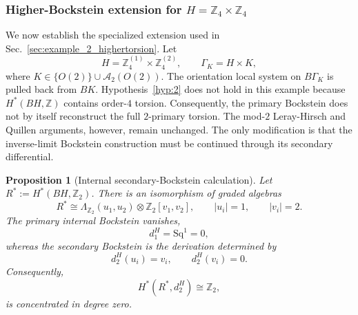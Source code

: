 \documentclass[aps,prx,reprint,superscriptaddress,twocolumn,amsmath,amssymb,amsfonts, nofootinbib]{revtex4-2}
\theoremstyle{apsstyle}
\newtheorem{proposition}[theorem]{Proposition}
\begin{document}
\subsubsection{Higher-Bockstein extension for $H=\mathbb Z_4\times\mathbb Z_4$}
\label{app:higher_order_example}

We now establish the specialized extension used in
Sec.~\ref{sec:example_2_highertorsion}. Let
\begin{equation*}
H=\mathbb Z_4^{(1)}\times\mathbb Z_4^{(2)},
\qquad
\Gamma_K=H\times K,
\end{equation*}
where $K\in\{O(2)\}\cup\mathcal A_2(O(2))$. The orientation local system on $B\Gamma_K$ is pulled back from $BK$. Hypothesis~\ref{hyp:2} does not hold in this example because
$H^{*}(BH,\mathbb Z)$ contains order-$4$ torsion. Consequently, the primary Bockstein does not by itself reconstruct the full
$2$-primary torsion. The mod-$2$ Leray-Hirsch and Quillen arguments, however, remain unchanged. The only modification is that the inverse-limit Bockstein construction must be continued through its secondary differential.

\bigskip

\begin{proposition}[Internal secondary-Bockstein calculation]
\label{prop:Z4Z4_internal_Bockstein}
Let $R^{*}:=H^{*}(BH,\mathbb Z_2)$. There is an isomorphism of graded algebras
\begin{equation}
R^{*} \cong
\Lambda_{\mathbb Z_2}(u_1,u_2)
\otimes \mathbb Z_2[v_1,v_2],
\qquad
|u_i|=1, \qquad |v_i|=2.
\label{eq:Z4Z4_mod2_cohomology}
\end{equation}
The primary internal Bockstein vanishes,
\begin{equation}
d_1^{H}=\mathrm{Sq}^{1}=0,
\label{eq:Z4Z4_d1_zero}
\end{equation}
whereas the secondary Bockstein is the derivation determined by
\begin{equation}
d_2^{H}(u_i)=v_i,
\qquad
d_2^{H}(v_i)=0.
\label{eq:Z4Z4_d2_generators}
\end{equation}
Consequently,
\begin{equation}
H^{*}(R^{*},d_2^{H})
\cong
\mathbb Z_2,
\label{eq:Z4Z4_d2_cohomology}
\end{equation}
is concentrated in degree zero.
\end{proposition}
\end{document}
